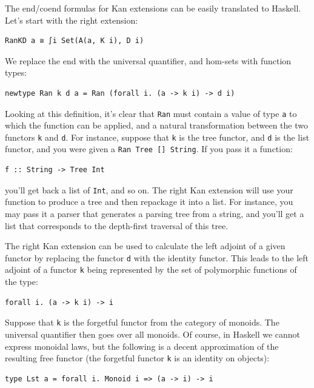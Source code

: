 The end/coend formulas for Kan extensions can be easily translated to
Haskell. Let's start with the right extension:

\begin{verbatim}
RanKD a ≅ ∫i Set(A(a, K i), D i)
\end{verbatim}

We replace the end with the universal quantifier, and hom-sets with
function types:

\begin{verbatim}
newtype Ran k d a = Ran (forall i. (a -> k i) -> d i)
\end{verbatim}

Looking at this definition, it's clear that \texttt{Ran} must contain a
value of type \texttt{a} to which the function can be applied, and a
natural transformation between the two functors \texttt{k} and
\texttt{d}. For instance, suppose that \texttt{k} is the tree functor,
and \texttt{d} is the list functor, and you were given a
\texttt{Ran\ Tree\ {[}{]}\ String}. If you pass it a function:

\begin{verbatim}
f :: String -> Tree Int
\end{verbatim}

you'll get back a list of \texttt{Int}, and so on. The right Kan
extension will use your function to produce a tree and then repackage it
into a list. For instance, you may pass it a parser that generates a
parsing tree from a string, and you'll get a list that corresponds to
the depth-first traversal of this tree.

The right Kan extension can be used to calculate the left adjoint of a
given functor by replacing the functor \texttt{d} with the identity
functor. This leads to the left adjoint of a functor \texttt{k} being
represented by the set of polymorphic functions of the type:

\begin{verbatim}
forall i. (a -> k i) -> i
\end{verbatim}

Suppose that \texttt{k} is the forgetful functor from the category of
monoids. The universal quantifier then goes over all monoids. Of course,
in Haskell we cannot express monoidal laws, but the following is a
decent approximation of the resulting free functor (the forgetful
functor \texttt{k} is an identity on objects):

\begin{verbatim}
type Lst a = forall i. Monoid i => (a -> i) -> i
\end{verbatim}

